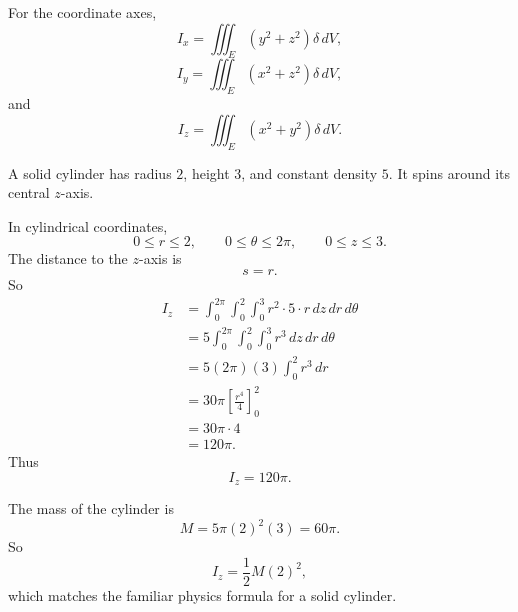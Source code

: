 For the coordinate axes,
\[
\boxed{
    I_x=\iiint_E (y^2+z^2)\delta\,dV,
}
\]
\[
\boxed{
    I_y=\iiint_E (x^2+z^2)\delta\,dV,
}
\]
and
\[
\boxed{
    I_z=\iiint_E (x^2+y^2)\delta\,dV.
}
\]

\begin{example}
A solid cylinder has radius \(2\), height \(3\), and constant density \(5\).  It spins
around its central \(z\)-axis.

In cylindrical coordinates,
\[
    0\le r\le2,
    \qquad
    0\le\theta\le2\pi,
    \qquad
    0\le z\le3.
\]
The distance to the \(z\)-axis is
\[
    s=r.
\]
So
\[
\begin{aligned}
I_z
&=
\int_0^{2\pi}\int_0^2\int_0^3
r^2\cdot 5\cdot r\,dz\,dr\,d\theta\\
&=
5\int_0^{2\pi}\int_0^2\int_0^3
r^3\,dz\,dr\,d\theta\\
&=
5(2\pi)(3)\int_0^2 r^3\,dr\\
&=
30\pi\left[\frac{r^4}{4}\right]_0^2\\
&=
30\pi\cdot4\\
&=
120\pi.
\end{aligned}
\]
Thus
\[
\boxed{
    I_z=120\pi.
}
\]

The mass of the cylinder is
\[
    M=5\pi(2)^2(3)=60\pi.
\]
So
\[
    I_z=\frac12M(2)^2,
\]
which matches the familiar physics formula for a solid cylinder.
\end{example}


